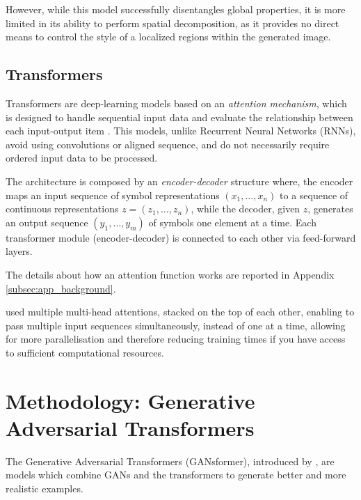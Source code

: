 \documentclass{article}
\begin{document}
	However, while this model successfully disentangles global properties, it is more limited in its 
	ability 
	to perform spatial decomposition, as it provides no direct means to control the style of a 
	localized 
	regions within the generated image.

	\subsection{Transformers}\label{sec:transformer}
	Transformers are deep-learning models based on an \textit{attention mechanism}, which is 
	designed 
	to handle sequential input data and evaluate the relationship between each input-output item 
	\cite{vaswani2017attention}.
	This models, unlike Recurrent Neural Networks (RNNs), avoid using convolutions or aligned 
	sequence, and do not necessarily require ordered input data to be processed. 
	
	The architecture is composed by an \textit{encoder-decoder} structure where, the {encoder} 
	maps 
	an input sequence of symbol representations $(x_1,\dots, x_n)$ to a sequence of continuous 
	representations $z = (z_1, \dots, z_n)$, while the  {decoder}, given $z$, generates an output 
	sequence $(y_1, \dots, y_m)$ of symbols one element at a time. 
	Each transformer module (encoder-decoder) is connected to each other via feed-forward 
	layers.
	
	The details about how an attention function works are reported in Appendix 
	\ref{subsec:app_background}. 

	\citet{vaswani2017attention} used multiple multi-head attentions, stacked on the top of each 
	other, 
	enabling to pass multiple input sequences simultaneously, instead of one at a time, allowing 
	for 
	more parallelisation and therefore reducing training times if you have access to sufficient 
	computational resources.

	\section{Methodology: Generative Adversarial Transformers}\label{sec:ganformer}
	
	The Generative Adversarial Transformers (GANsformer), introduced by 
	\citet{hudson2021generative}, are models which combine GANs and the transformers to 
	generate 
	better and more realistic examples.
	
\end{document}

